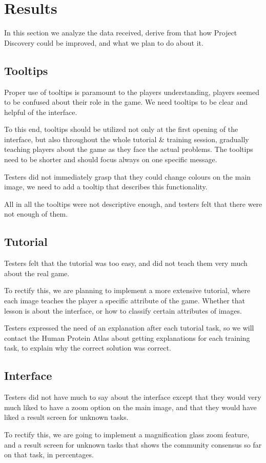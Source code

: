 \section{Results}\label{sec:results}
In this section we analyze the data received, derive from that how Project Discovery could be improved, and what we plan to do about it.

\subsection{Tooltips}
Proper use of tooltips is paramount to the players understanding, players seemed to be confused about their role in the game. We need tooltips to be clear and helpful of the interface.

To this end, tooltips should be utilized not only at the first opening of the interface, but also throughout the whole tutorial \& training session, gradually teaching players about the game as they face the actual problems.
The tooltips need to be shorter and should focus always on one specific message.

Testers did not immediately grasp that they could change colours on the main image, we need to add a tooltip that describes this functionality.

All in all the tooltips were not descriptive enough, and testers felt that there were not enough of them.

\subsection{Tutorial}
Testers felt that the tutorial was too easy, and did not teach them very much about the real game.

To rectify this, we are planning to implement a more extensive tutorial, where each image teaches the player a specific attribute of the game. Whether that lesson is about the interface, or how to classify certain attributes of images. 

Testers expressed the need of an explanation after each tutorial task, so we will contact the Human Protein Atlas about getting explanations for each training task, to explain why the correct solution was correct.

\subsection{Interface}
Testers did not have much to say about the interface except that they would very much liked to have a zoom option on the main image, and that they would have liked a result screen for unknown tasks. 

To rectify this, we are going to implement a magnification glass zoom feature, and a result screen for unknown tasks that shows the community consensus so far on that task, in percentages. 